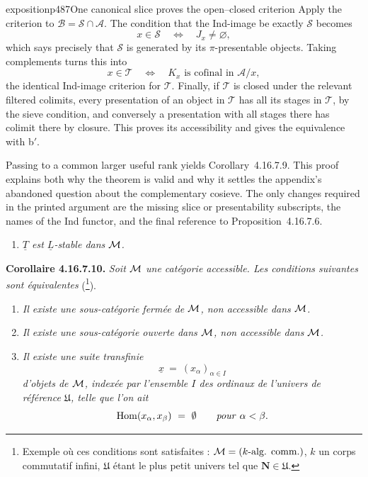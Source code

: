 \begin{dcomment}{exposition}{p487}{One canonical slice proves the open--closed criterion}
Apply the criterion to $\mathcal B=\mathcal S\cap\mathcal A$. The condition that the Ind-image be exactly $\mathcal S$ becomes
\[
 x\in\mathcal S
 \quad\Longleftrightarrow\quad
 J_x\ne\varnothing,
\]
which says precisely that $\mathcal S$ is generated by its $\pi$-presentable objects. Taking complements turns this into
\[
 x\in\mathcal T
 \quad\Longleftrightarrow\quad
 K_x\text{ is cofinal in }\mathcal A/x,
\]
the identical Ind-image criterion for $\mathcal T$. Finally, if $\mathcal T$ is closed under the relevant filtered colimits, every presentation of an object in $\mathcal T$ has all its stages in $\mathcal T$, by the sieve condition, and conversely a presentation with all stages there has colimit there by closure. This proves its accessibility and gives the equivalence with b$'$.

Passing to a common larger useful rank yields Corollary~4.16.7.9. This proof explains both why the theorem is valid and why it settles the appendix's abandoned question about the complementary cosieve. The only changes required in the printed argument are the missing slice or presentability subscripts, the names of the Ind functor, and the final reference to Proposition~4.16.7.6.
\end{dcomment}



\begin{enumerate}
\item[\textit{b$'$)}] \textit{$\underline{T}$ est $\underline{L}$-stable dans $\mathcal{M}$.}
\end{enumerate}

\noindent\textbf{Corollaire 4.16.7.10.} \textit{Soit $\mathcal{M}$ une catégorie accessible. Les conditions suivantes sont équivalentes} (\footnote[202]{Exemple où ces conditions sont satisfaites : $\mathcal{M} = (k\text{-alg. comm.})$, $k$ un corps commutatif infini, $\mathfrak{U}$ étant le plus petit univers tel que $\mathbf{N}\in\mathfrak{U}$.}).
\begin{enumerate}
\item[\textit{a)}] \textit{Il existe une sous-catégorie fermée de $\mathcal{M}$, non accessible dans $\mathcal{M}$.}
\item[\textit{b)}] \textit{Il existe une sous-catégorie ouverte dans $\mathcal{M}$, non accessible dans $\mathcal{M}$.}
\item[\textit{c)}] \textit{Il existe une suite transfinie}
\[
\underline{x} \ = \ (x_\alpha)_{\alpha\in I}
\]
\textit{d'objets de $\mathcal{M}$, indexée par l'ensemble $I$ des ordinaux de l'univers de référence $\mathfrak{U}$, telle que l'on ait}
\[
\operatorname{Hom}(x_\alpha,x_\beta) \ = \ \emptyset \qquad \text{\textit{pour} } \alpha<\beta .
\]
\end{enumerate}

